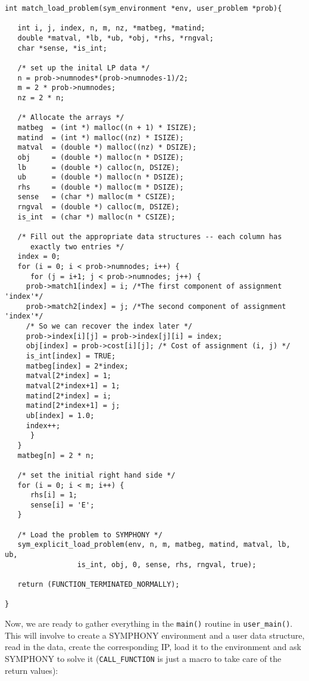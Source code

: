 \documentclass[11pt]{article}
\begin{document}
\begin{verbatim}
int match_load_problem(sym_environment *env, user_problem *prob){
   
   int i, j, index, n, m, nz, *matbeg, *matind;
   double *matval, *lb, *ub, *obj, *rhs, *rngval;
   char *sense, *is_int;
   
   /* set up the inital LP data */
   n = prob->numnodes*(prob->numnodes-1)/2;
   m = 2 * prob->numnodes;
   nz = 2 * n;

   /* Allocate the arrays */
   matbeg  = (int *) malloc((n + 1) * ISIZE);
   matind  = (int *) malloc((nz) * ISIZE);
   matval  = (double *) malloc((nz) * DSIZE);
   obj     = (double *) malloc(n * DSIZE);
   lb      = (double *) calloc(n, DSIZE);
   ub      = (double *) malloc(n * DSIZE);
   rhs     = (double *) malloc(m * DSIZE);
   sense   = (char *) malloc(m * CSIZE);
   rngval  = (double *) calloc(m, DSIZE);
   is_int  = (char *) malloc(n * CSIZE);
   
   /* Fill out the appropriate data structures -- each column has
      exactly two entries */
   index = 0;
   for (i = 0; i < prob->numnodes; i++) {
      for (j = i+1; j < prob->numnodes; j++) {
	 prob->match1[index] = i; /*The first component of assignment 'index'*/
	 prob->match2[index] = j; /*The second component of assignment 'index'*/
	 /* So we can recover the index later */
	 prob->index[i][j] = prob->index[j][i] = index;
	 obj[index] = prob->cost[i][j]; /* Cost of assignment (i, j) */
	 is_int[index] = TRUE;
	 matbeg[index] = 2*index;
	 matval[2*index] = 1;
	 matval[2*index+1] = 1;
	 matind[2*index] = i;
	 matind[2*index+1] = j;
	 ub[index] = 1.0;
	 index++;
      }
   }
   matbeg[n] = 2 * n;
   
   /* set the initial right hand side */
   for (i = 0; i < m; i++) {
      rhs[i] = 1;
      sense[i] = 'E';
   }
   
   /* Load the problem to SYMPHONY */   
   sym_explicit_load_problem(env, n, m, matbeg, matind, matval, lb, ub, 
			     is_int, obj, 0, sense, rhs, rngval, true);
			     
   return (FUNCTION_TERMINATED_NORMALLY);

}
\end{verbatim}

Now, we are ready to gather everything in the \texttt{main()} routine in 
\texttt{user\_main()}. This will involve to create a SYMPHONY environment and 
a user data structure, read in the data, create the corresponding IP, 
load it to the environment and ask SYMPHONY to solve it 
(\texttt{CALL\_FUNCTION} is just a macro to take care of the return values):  
\end{document}
